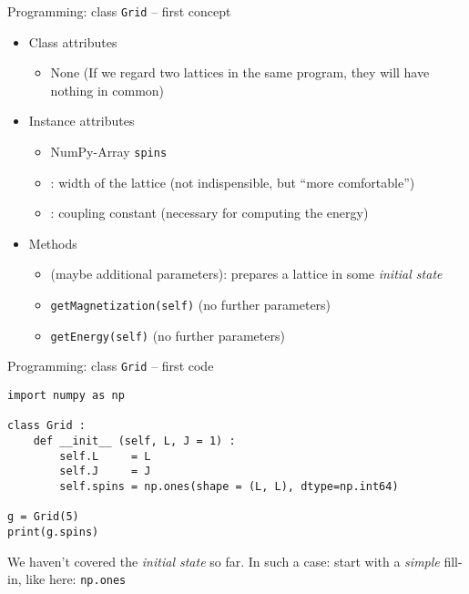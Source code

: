 
\begin{frame}[fragile]{Programming: class \texttt{Grid} -- first concept}
%
\vspace{-6pt}
\begin{tcolorbox}[title=class \texttt{Grid}]

\vspace{-3pt}
\begin{itemize}
\item Class attributes
	\begin{itemize}
	\item None (If we regard two lattices in the same program, they will have nothing in common)
	\end{itemize}
\item Instance attributes
	\begin{itemize}
	\item NumPy-Array \texttt{spins}
	\item {}: width of the lattice (not indispensible, but \enquote{more comfortable})
	\item {}: coupling constant (necessary for computing the energy)
	\end{itemize}
\item Methods
	\begin{itemize}
	\item {} (maybe additional parameters): prepares a lattice in some \emph{initial state}
	\item \texttt{getMagnetization(self)} (no further parameters)
	\item \texttt{getEnergy(self)} (no further parameters)
	\end{itemize}
\end{itemize}
\end{tcolorbox}
%
\end{frame}


\begin{frame}[fragile]{Programming: class \texttt{Grid} -- first code}
%
\vspace{-6pt}
\begin{codebox}
\begin{verbatim}
import numpy as np

class Grid :
    def __init__ (self, L, J = 1) :
        self.L     = L
        self.J     = J
        self.spins = np.ones(shape = (L, L), dtype=np.int64)

g = Grid(5)
print(g.spins)
\end{verbatim}
\end{codebox}
%

\vspace{-12pt}
\begin{hintbox}
We haven't covered the \emph{initial state} so far. In such a case: start with a \emph{simple} fill-in, like here: \texttt{np.ones}
\end{hintbox}
%
\end{frame}

